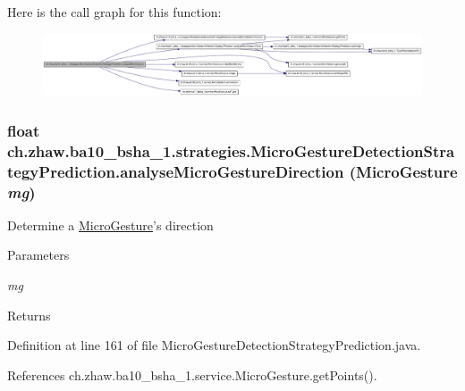 Here is the call graph for this function:\nopagebreak
\begin{figure}[H]
\begin{center}
\leavevmode
\includegraphics[width=420pt]{classch_1_1zhaw_1_1ba10__bsha__1_1_1strategies_1_1MicroGestureDetectionStrategyPrediction_a741f6f5dfadc6a6ad25f03088ff55fc9_cgraph}
\end{center}
\end{figure}
\hypertarget{classch_1_1zhaw_1_1ba10__bsha__1_1_1strategies_1_1MicroGestureDetectionStrategyPrediction_aa2db648dc936c5f878575a23b7915347}{
\subsubsection[{analyseMicroGestureDirection}]{\setlength{\rightskip}{0pt plus 5cm}float ch.zhaw.ba10\_\-bsha\_\-1.strategies.MicroGestureDetectionStrategyPrediction.analyseMicroGestureDirection ({\bf MicroGesture} {\em mg})}}
\label{classch_1_1zhaw_1_1ba10__bsha__1_1_1strategies_1_1MicroGestureDetectionStrategyPrediction_aa2db648dc936c5f878575a23b7915347}
Determine a \hyperlink{}{MicroGesture}'s direction


\begin{DoxyParams}{Parameters}
\item[{\em mg}]\end{DoxyParams}
\begin{DoxyReturn}{Returns}

\end{DoxyReturn}


Definition at line 161 of file MicroGestureDetectionStrategyPrediction.java.

References ch.zhaw.ba10\_\-bsha\_\-1.service.MicroGesture.getPoints().

